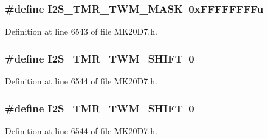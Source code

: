 \subsubsection[{\texorpdfstring{I2\+S\+\_\+\+T\+M\+R\+\_\+\+T\+W\+M\+\_\+\+M\+A\+SK}{I2S_TMR_TWM_MASK}}]{\setlength{\rightskip}{0pt plus 5cm}\#define I2\+S\+\_\+\+T\+M\+R\+\_\+\+T\+W\+M\+\_\+\+M\+A\+SK~0x\+F\+F\+F\+F\+F\+F\+F\+Fu}\hypertarget{group___i2_s___register___masks_ga0c694ab6fec26ca6fc159fe1d8ccb591}{}\label{group___i2_s___register___masks_ga0c694ab6fec26ca6fc159fe1d8ccb591}


Definition at line 6543 of file M\+K20\+D7.\+h.

\subsubsection[{\texorpdfstring{I2\+S\+\_\+\+T\+M\+R\+\_\+\+T\+W\+M\+\_\+\+S\+H\+I\+FT}{I2S_TMR_TWM_SHIFT}}]{\setlength{\rightskip}{0pt plus 5cm}\#define I2\+S\+\_\+\+T\+M\+R\+\_\+\+T\+W\+M\+\_\+\+S\+H\+I\+FT~0}\hypertarget{group___i2_s___register___masks_ga50ccb20fbe6c1de252bfe8ffba29fb3e}{}\label{group___i2_s___register___masks_ga50ccb20fbe6c1de252bfe8ffba29fb3e}


Definition at line 6544 of file M\+K20\+D7.\+h.

\subsubsection[{\texorpdfstring{I2\+S\+\_\+\+T\+M\+R\+\_\+\+T\+W\+M\+\_\+\+S\+H\+I\+FT}{I2S_TMR_TWM_SHIFT}}]{\setlength{\rightskip}{0pt plus 5cm}\#define I2\+S\+\_\+\+T\+M\+R\+\_\+\+T\+W\+M\+\_\+\+S\+H\+I\+FT~0}\hypertarget{group___i2_s___register___masks_ga50ccb20fbe6c1de252bfe8ffba29fb3e}{}\label{group___i2_s___register___masks_ga50ccb20fbe6c1de252bfe8ffba29fb3e}


Definition at line 6544 of file M\+K20\+D7.\+h.

